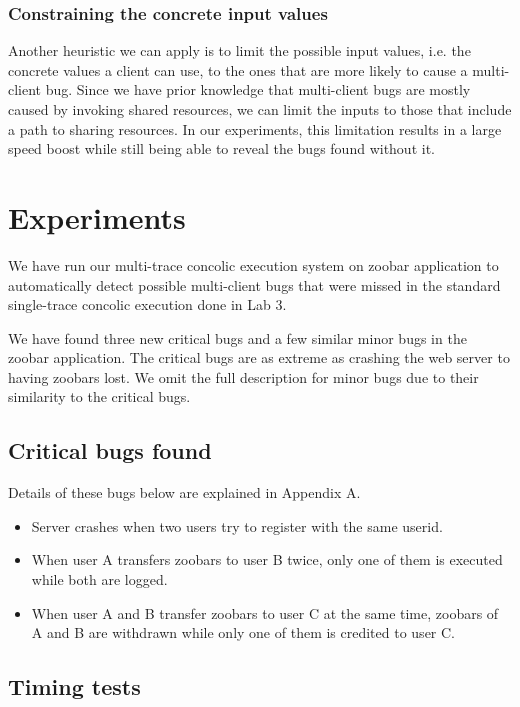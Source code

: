 \documentclass{llncs}
\begin{document}
\subsubsection{Constraining the concrete input values}

Another heuristic we can apply is to limit the possible input values,
i.e. the concrete values a client can use, to the ones that are more
likely to cause a multi-client bug. Since we have prior knowledge that
multi-client bugs are mostly caused by invoking shared resources, we
can limit the inputs to those that include a path to sharing
resources. In our experiments, this limitation results in a large
speed boost while still being able to reveal the bugs found without
it.

\section{Experiments}

We have run our multi-trace concolic execution system on zoobar
application to automatically detect possible multi-client bugs that
were missed in the standard single-trace concolic execution done in
Lab 3.

We have found three new critical bugs and a few similar minor bugs 
in the zoobar application. The critical bugs are as extreme as crashing the 
web server to having zoobars lost. We omit the full description for minor bugs
due to their similarity to the critical bugs.
\subsection{Critical bugs found}
Details of these bugs below are explained in Appendix A.
\begin{itemize}
  \item Server crashes when two users try to register with the same userid.
  \item When user A transfers zoobars to user B twice, only one of them is
  executed while both are logged.
  \item When user A and B transfer zoobars to user C at the same time, zoobars
  of A and B are withdrawn while only one of them is credited to user C.
\end{itemize}

\subsection{Timing tests}
\end{document}
